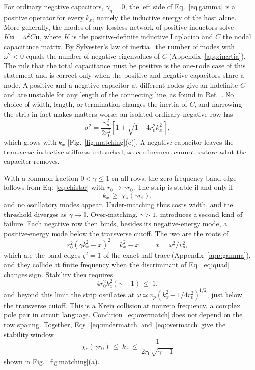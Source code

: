 \documentclass[aps,prapplied,twocolumn,superscriptaddress,floatfix,longbibliography]{revtex4-2}
\begin{document}
For ordinary negative capacitors, $\gamma_n=0$, the left side of Eq.~\eqref{eq:gamma} is a positive operator for every $k_x$, namely the inductive energy of the host alone. More generally, the modes of any lossless network of positive inductors solve $K\bm u=\omega^2C\bm u$, where $K$ is the positive-definite inductive Laplacian and $C$ the nodal capacitance matrix. By Sylvester's law of inertia~\cite{Horn_2013:book} the number of modes with $\omega^2<0$ equals the number of negative eigenvalues of $C$ (Appendix~\ref{app:inertia}). The rule that the total capacitance must be positive is the one-node case of this statement and is correct only when the positive and negative capacitors share a node. A positive and a negative capacitor at different nodes give an indefinite $C$ and are unstable for any length of the connecting line, as found in Ref.~\cite{Loncar_2017:TAP}. No choice of width, length, or termination changes the inertia of $C$, and narrowing the strip in fact makes matters worse: an isolated ordinary negative row has
\begin{equation}
\sigma^2=\frac{v_p^2}{2r_0^2}\left[1+\sqrt{1+4r_0^2k_x^2}\right],
\label{eq:sigma0}
\end{equation}
which grows with $k_x$ [Fig.~\ref{fig:matching}(c)]. A negative capacitor leaves the transverse inductive stiffness untouched, so confinement cannot restore what the capacitor removes.

With a common fraction $0<\gamma\le1$ on all rows, the zero-frequency band edge follows from Eq.~\eqref{eq:chistar} with $r_0\to\gamma r_0$. The strip is stable if and only if
\begin{equation}
k_x\ \ge\ \chi_*(\gamma r_0),
\label{eq:undermatch}
\end{equation}
and no oscillatory modes appear. Under-matching thus costs width, and the threshold diverges as $\gamma\to0$. Over-matching, $\gamma>1$, introduces a second kind of failure. Each negative row then binds, besides its negative-energy mode, a positive-energy mode below the transverse cutoff. The two are the roots of
\begin{equation}
r_0^2\left(\gamma k_x^2-x\right)^2=k_x^2-x,\qquad x=\omega^2/v_p^2 ,
\label{eq:quad}
\end{equation}
which are the band edges $q^2=1$ of the exact half-trace (Appendix~\ref{app:gamma}), and they collide at finite frequency when the discriminant of Eq.~\eqref{eq:quad} changes sign. Stability then requires
\begin{equation}
4r_0^2k_x^2(\gamma-1)\ \le\ 1 ,
\label{eq:overmatch}
\end{equation}
and beyond this limit the strip oscillates at $\omega\simeq v_p(k_x^2-1/4r_0^2)^{1/2}$, just below the transverse cutoff. This is a Krein collision at nonzero frequency, a complex pole pair in circuit language. Condition~\eqref{eq:overmatch} does not depend on the row spacing. Together, Eqs.~\eqref{eq:undermatch} and~\eqref{eq:overmatch} give the stability window
\begin{equation}
\chi_*(\gamma r_0)\ \le\ k_x\ \le\ \frac{1}{2r_0\sqrt{\gamma-1}}
\label{eq:window}
\end{equation}
shown in Fig.~\ref{fig:matching}(a).
\end{document}
